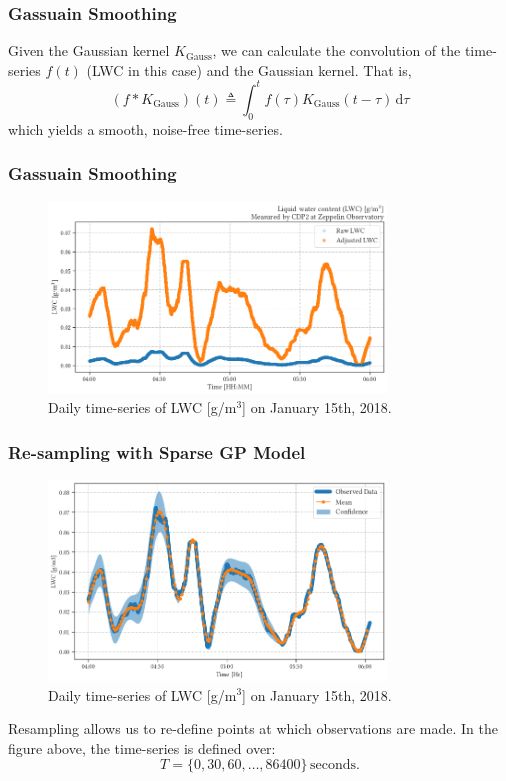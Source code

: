 \documentclass{beamer}
\begin{document}
\begin{frame}
    \frametitle{Gassuain Smoothing}
    Given the Gaussian kernel $K_\mathrm{Gauss}$, we can calculate the convolution of the time-series $f(t)$ (LWC in this case) and the Gaussian kernel. That is,
    \begin{equation}
        (f * K_\mathrm{Gauss})(t) \triangleq \int_0^t f(\tau) K_\mathrm{Gauss}(t - \tau) \,\mathrm{d} \tau
    \end{equation}
    which yields a smooth, noise-free time-series.
\end{frame}

\begin{frame}
    \frametitle{Gassuain Smoothing}
    \begin{figure}
        \centering
        \includegraphics[width=0.8\textwidth]{img/conv.png}
        \caption{Daily time-series of LWC [g/m$^3$] on January 15th, 2018.}
    \end{figure}
\end{frame}

\begin{frame}
    \frametitle{Re-sampling with Sparse GP Model}
    \begin{figure}
        \centering
        \includegraphics[width=0.8\textwidth]{img/sgp.png}
        \caption{Daily time-series of LWC [g/m$^3$] on January 15th, 2018.}
    \end{figure}

    Resampling allows us to re-define points at which observations are made. In the figure above, the time-series is defined over:
    \begin{equation*}
        T = \{ 0, 30, 60, \dots, 86400 \} \, \mathrm{seconds}.
    \end{equation*}
\end{frame}
\end{document}
